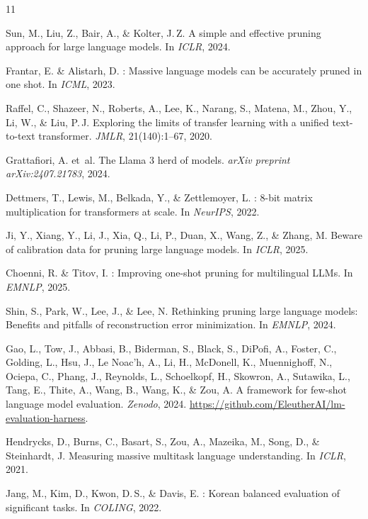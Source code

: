 \documentclass{article}
\begin{document}
\begin{thebibliography}{11}

Sun, M., Liu, Z., Bair, A., \& Kolter, J.\,Z.
\newblock A simple and effective pruning approach for large language models.
\newblock In \emph{ICLR}, 2024.

Frantar, E. \& Alistarh, D.
: Massive language models can be accurately pruned in one shot.
\newblock In \emph{ICML}, 2023.

Raffel, C., Shazeer, N., Roberts, A., Lee, K., Narang, S., Matena, M., Zhou, Y., Li, W., \& Liu, P.\,J.
\newblock Exploring the limits of transfer learning with a unified text-to-text transformer.
\newblock \emph{JMLR}, 21(140):1--67, 2020.

Grattafiori, A. et~al.
\newblock The {L}lama 3 herd of models.
\newblock \emph{arXiv preprint arXiv:2407.21783}, 2024.

Dettmers, T., Lewis, M., Belkada, Y., \& Zettlemoyer, L.
: 8-bit matrix multiplication for transformers at scale.
\newblock In \emph{NeurIPS}, 2022.

Ji, Y., Xiang, Y., Li, J., Xia, Q., Li, P., Duan, X., Wang, Z., \& Zhang, M.
\newblock Beware of calibration data for pruning large language models.
\newblock In \emph{ICLR}, 2025.

Choenni, R. \& Titov, I.
: Improving one-shot pruning for multilingual {LLM}s.
\newblock In \emph{EMNLP}, 2025.

Shin, S., Park, W., Lee, J., \& Lee, N.
\newblock Rethinking pruning large language models: Benefits and pitfalls of reconstruction error minimization.
\newblock In \emph{EMNLP}, 2024.

Gao, L., Tow, J., Abbasi, B., Biderman, S., Black, S., DiPofi, A., Foster, C., Golding, L., Hsu, J., Le Noac'h, A., Li, H., McDonell, K., Muennighoff, N., Ociepa, C., Phang, J., Reynolds, L., Schoelkopf, H., Skowron, A., Sutawika, L., Tang, E., Thite, A., Wang, B., Wang, K., \& Zou, A.
\newblock A framework for few-shot language model evaluation.
\newblock \emph{Zenodo}, 2024.
\newblock \url{https://github.com/EleutherAI/lm-evaluation-harness}.

Hendrycks, D., Burns, C., Basart, S., Zou, A., Mazeika, M., Song, D., \& Steinhardt, J.
\newblock Measuring massive multitask language understanding.
\newblock In \emph{ICLR}, 2021.

Jang, M., Kim, D., Kwon, D.\,S., \& Davis, E.
: {K}orean balanced evaluation of significant tasks.
\newblock In \emph{COLING}, 2022.

\end{thebibliography}
\end{document}
